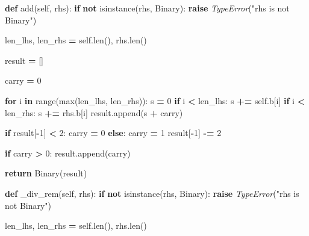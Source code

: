 \documentclass[
]{article}
\newenvironment{Shaded}{\begin{snugshade}}{\end{snugshade}}
\newcommand{\BuiltInTok}[1]{#1}
\newcommand{\ControlFlowTok}[1]{\textcolor[rgb]{0.13,0.29,0.53}{\textbf{#1}}}
\newcommand{\DecValTok}[1]{\textcolor[rgb]{0.00,0.00,0.81}{#1}}
\newcommand{\KeywordTok}[1]{\textcolor[rgb]{0.13,0.29,0.53}{\textbf{#1}}}
\newcommand{\NormalTok}[1]{#1}
\newcommand{\OperatorTok}[1]{\textcolor[rgb]{0.81,0.36,0.00}{\textbf{#1}}}
\newcommand{\PreprocessorTok}[1]{\textcolor[rgb]{0.56,0.35,0.01}{\textit{#1}}}
\newcommand{\StringTok}[1]{\textcolor[rgb]{0.31,0.60,0.02}{#1}}
\newcommand{\VariableTok}[1]{\textcolor[rgb]{0.00,0.00,0.00}{#1}}
\begin{document}
\begin{Shaded}
\begin{Highlighting}[]
{    \KeywordTok{def}\NormalTok{ add(}\VariableTok{self}\NormalTok{, rhs):}
        \ControlFlowTok{if} \KeywordTok{not} \BuiltInTok{isinstance}\NormalTok{(rhs, Binary):}
            \ControlFlowTok{raise} \PreprocessorTok{TypeError}\NormalTok{(}\StringTok{"rhs is not Binary"}\NormalTok{)}
  
\NormalTok{        len_lhs, len_rhs }\OperatorTok{=} \VariableTok{self}\NormalTok{.}\BuiltInTok{len}\NormalTok{(), rhs.}\BuiltInTok{len}\NormalTok{()}
  
\NormalTok{        result }\OperatorTok{=}\NormalTok{ []}
  
\NormalTok{        carry }\OperatorTok{=} \DecValTok{0}
  
        \ControlFlowTok{for}\NormalTok{ i }\KeywordTok{in} \BuiltInTok{range}\NormalTok{(}\BuiltInTok{max}\NormalTok{(len_lhs, len_rhs)):}
\NormalTok{            s }\OperatorTok{=} \DecValTok{0}
            \ControlFlowTok{if}\NormalTok{ i }\OperatorTok{<}\NormalTok{ len_lhs:}
\NormalTok{                s }\OperatorTok{+=} \VariableTok{self}\NormalTok{.b[i]}
            \ControlFlowTok{if}\NormalTok{ i }\OperatorTok{<}\NormalTok{ len_rhs:}
\NormalTok{                s }\OperatorTok{+=}\NormalTok{ rhs.b[i]}
\NormalTok{            result.append(s }\OperatorTok{+}\NormalTok{ carry)}
  
            \ControlFlowTok{if}\NormalTok{ result[}\OperatorTok{-}\DecValTok{1}\NormalTok{] }\OperatorTok{<} \DecValTok{2}\NormalTok{:}
\NormalTok{                carry }\OperatorTok{=} \DecValTok{0}
            \ControlFlowTok{else}\NormalTok{:}
\NormalTok{                carry }\OperatorTok{=} \DecValTok{1}
\NormalTok{                result[}\OperatorTok{-}\DecValTok{1}\NormalTok{] }\OperatorTok{-=} \DecValTok{2}
  
        \ControlFlowTok{if}\NormalTok{ carry }\OperatorTok{>} \DecValTok{0}\NormalTok{:}
\NormalTok{            result.append(carry)}
  
        \ControlFlowTok{return}\NormalTok{ Binary(result)}
  
    \KeywordTok{def}\NormalTok{ _div_rem(}\VariableTok{self}\NormalTok{, rhs):}
        \ControlFlowTok{if} \KeywordTok{not} \BuiltInTok{isinstance}\NormalTok{(rhs, Binary):}
            \ControlFlowTok{raise} \PreprocessorTok{TypeError}\NormalTok{(}\StringTok{"rhs is not Binary"}\NormalTok{)}
  
\NormalTok{        len_lhs, len_rhs }\OperatorTok{=} \VariableTok{self}\NormalTok{.}\BuiltInTok{len}\NormalTok{(), rhs.}\BuiltInTok{len}\NormalTok{()}
  
}
\end{Highlighting}
\end{Shaded}
\end{document}
